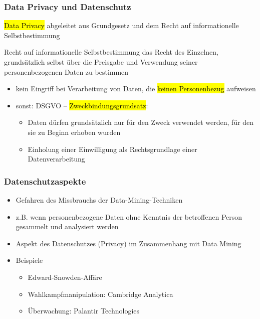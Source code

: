 \begin{frame}
  \frametitle{Data Privacy und Datenschutz}

 
\hl{Data Privacy} abgeleitet aus Grundgesetz und dem Recht auf informationelle Selbstbestimmung

\begin{block}{Recht auf informationelle Selbstbestimmung}
das Recht des Einzelnen, grundsätzlich selbst über die Preisgabe und Verwendung seiner personenbezogenen Daten zu bestimmen
\end{block}

\begin{itemize}
  \item kein Eingriff bei Verarbeitung von Daten, die \hl{keinen Personenbezug} aufweisen
  \item sonst: DSGVO -- \hl{Zweckbindungsgrundsatz}: 
  \begin{itemize}
    \item Daten dürfen grundsätzlich nur für den Zweck verwendet werden, für den sie zu Beginn erhoben wurden 
    \item  Einholung einer Einwilligung als Rechtsgrundlage einer Datenverarbeitung
  \end{itemize}
\end{itemize}
\end{frame}


\begin{frame}
\frametitle{Datenschutzaspekte}

\begin{itemize}
\item Gefahren des Missbrauchs der Data-Mining-Techniken
\item z.B. wenn personenbezogene Daten ohne Kenntnis der
  betroffenen Person gesammelt und analysiert werden
\item Aspekt des Datenschutzes (Privacy) im Zusammenhang mit Data Mining
\item Beispiele
\begin{itemize}
\item Edward-Snowden-Affäre
\item Wahlkampfmanipulation: Cambridge Analytica
\item Überwachung: Palantir Technologies
\end{itemize}
\end{itemize}

\end{frame}


